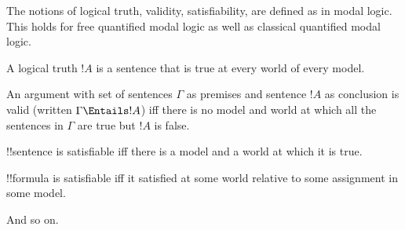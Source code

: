 \documentclass[../../../include/open-logic-section]{subfiles}
\begin{document}


\begin{explain}
The notions of logical truth, validity, satisfiability, are
defined as in modal logic. This holds for free quantified 
modal logic as well as classical quantified modal logic.

A logical truth $!A$ is a sentence that is true at every world of every model.

An argument with set of sentences $\Gamma$ as premises and sentence
$!A$ as conclusion is valid (written $\Gamma \Entails !A$) iff 
there is no model and world at which all the sentences in $\Gamma$ 
are true but $!A$ is false. 

 !!{sentence} is satisfiable iff there is a model and a world 
at which it is true.

 !!{formula} is satisfiable iff it satisfied at some
world relative to some assignment in some model. 

And so on.

\end{explain}
\end{document}
